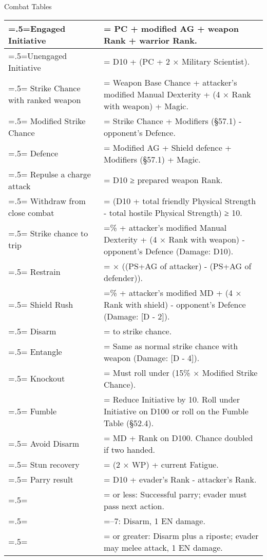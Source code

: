 \begin{Tables}{Combat Tables}
\begin{multicols}{3}
\begin{tabularx}{\columnwidth}{>{\hsize=.5\hsize\linewidth=\hsize}X>{\hsize=1.5\hsize\linewidth=\hsize}X}
Engaged Initiative			& PC + modified AG + weapon Rank + warrior Rank. \\ \hline
Unengaged Initiative			& D10 + (PC + 2 × Military Scientist). \\ \hline
Strike Chance with ranked weapon	& Weapon Base Chance + attacker’s modified Manual Dexterity + (4 × Rank with weapon) + Magic. \\ \hline
Modified Strike Chance			& Strike Chance + Modifiers (§57.1) - opponent’s Defence. \\ \hline
Defence					& Modified AG + Shield defence + Modifiers (§57.1) + Magic. \\ \hline
Repulse a charge attack			& D10 ≥ prepared weapon Rank.\\ \hline
Withdraw from close combat		& (D10 + total friendly Physical Strength - total hostile Physical Strength) ≥ 10. \\ \hline
Strike chance to trip			& 40\% + attacker’s modified Manual Dexterity + (4 × Rank with weapon) - opponent’s Defence (Damage: D10). \\ \hline
Restrain				& 3 × ((PS+AG of attacker) - (PS+AG of defender)). \\ \hline
Shield Rush				& 40\% + attacker’s modified MD + (4 × Rank with shield) - opponent’s Defence (Damage: [D - 2]). \\ \hline
Disarm					& -20 to strike chance. \\ \hline
Entangle				& Same as normal strike chance with weapon (Damage: [D - 4]). \\ \hline
Knockout				& Must roll under (15\% × Modified Strike Chance). \\ \hline
Fumble					& Reduce Initiative by 10. Roll under Initiative on D100 or roll on the Fumble Table (§52.4). \\ \hline
Avoid Disarm				& MD + Rank on D100. Chance doubled if two handed.\\ \hline
Stun recovery				& (2 × WP) + current Fatigue. \\ \hline
Parry result				& D10 + evader’s Rank - attacker’s Rank. \\
					& 3 or less: Successful parry; evader must pass next action. \\
					& 4–7: Disarm, 1 EN damage. \\
					& 8 or greater: Disarm plus a riposte; evader may melee attack, 1 EN damage. \\
\end{tabularx}


\end{multicols}
\end{Tables}
